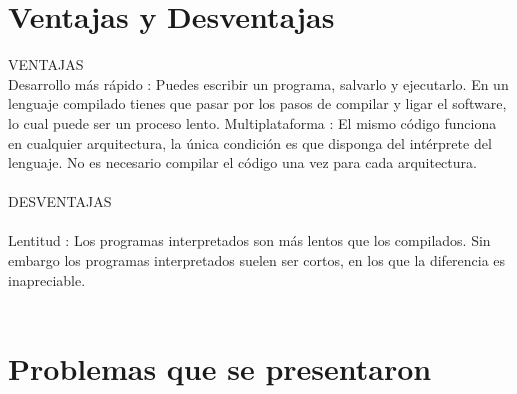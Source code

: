 \documentclass[11pt]{article} %
\begin{document}
\section{ Ventajas y Desventajas}
VENTAJAS\\
Desarrollo más rápido : Puedes escribir un programa, salvarlo y ejecutarlo. En un lenguaje compilado tienes que pasar por los pasos de compilar y ligar el software, lo cual puede ser un proceso lento.
Multiplataforma : El mismo código funciona en cualquier arquitectura, la única condición es que disponga del intérprete del lenguaje. No es necesario compilar el código una vez para cada arquitectura.\\\\
\newline
DESVENTAJAS\\\\
Lentitud : Los programas interpretados son más lentos que los compilados. Sin embargo los programas interpretados suelen ser cortos, en los que la diferencia es inapreciable.
\newline
\\
\newline
\\

\section{ Problemas que se presentaron}
\end{document}
